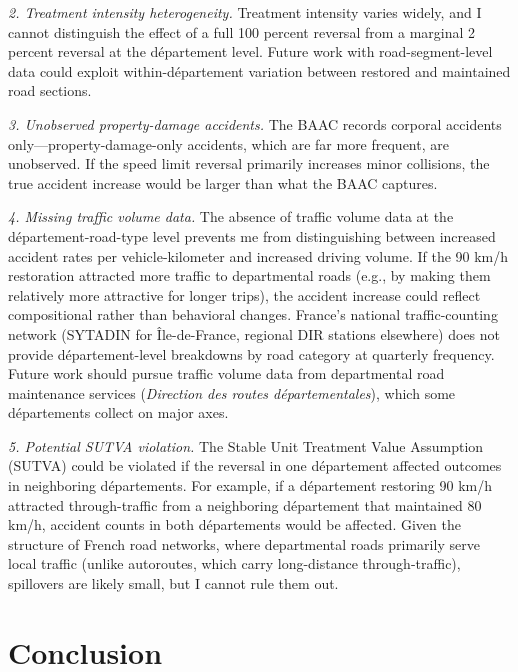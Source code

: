 \documentclass[12pt]{article}
\begin{document}
\textit{2. Treatment intensity heterogeneity.} Treatment intensity varies widely, and I cannot distinguish the effect of a full 100 percent reversal from a marginal 2 percent reversal at the d\'{e}partement level. Future work with road-segment-level data could exploit within-d\'{e}partement variation between restored and maintained road sections.

\textit{3. Unobserved property-damage accidents.} The BAAC records corporal accidents only---property-damage-only accidents, which are far more frequent, are unobserved. If the speed limit reversal primarily increases minor collisions, the true accident increase would be larger than what the BAAC captures.

\textit{4. Missing traffic volume data.} The absence of traffic volume data at the d\'{e}partement-road-type level prevents me from distinguishing between increased accident rates per vehicle-kilometer and increased driving volume. If the 90 km/h restoration attracted more traffic to departmental roads (e.g., by making them relatively more attractive for longer trips), the accident increase could reflect compositional rather than behavioral changes. France's national traffic-counting network (SYTADIN for \^{I}le-de-France, regional DIR stations elsewhere) does not provide d\'{e}partement-level breakdowns by road category at quarterly frequency. Future work should pursue traffic volume data from departmental road maintenance services (\textit{Direction des routes d\'{e}partementales}), which some d\'{e}partements collect on major axes.

\textit{5. Potential SUTVA violation.} The Stable Unit Treatment Value Assumption (SUTVA) could be violated if the reversal in one d\'{e}partement affected outcomes in neighboring d\'{e}partements. For example, if a d\'{e}partement restoring 90 km/h attracted through-traffic from a neighboring d\'{e}partement that maintained 80 km/h, accident counts in both d\'{e}partements would be affected. Given the structure of French road networks, where departmental roads primarily serve local traffic (unlike autoroutes, which carry long-distance through-traffic), spillovers are likely small, but I cannot rule them out.


\section{Conclusion} \label{sec:conclusion}
\end{document}
